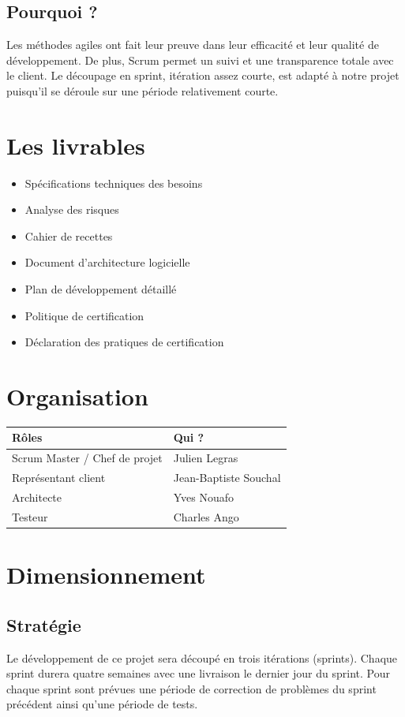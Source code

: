 \documentclass[a4paper,11pt,french]{article}
\begin{document}
\subsection{Pourquoi ?}
Les méthodes agiles ont fait leur preuve dans leur efficacité et leur qualité de développement. De plus, Scrum permet un suivi et une transparence totale avec le client. Le découpage en sprint, itération assez courte, est adapté à notre projet puisqu'il se déroule sur une période relativement courte.

\section{Les livrables}
\begin{itemize}
\item Spécifications techniques des besoins
\item Analyse des risques
\item Cahier de recettes
\item Document d'architecture logicielle
\item Plan de développement détaillé
\item Politique de certification
\item Déclaration des pratiques de certification
\end{itemize}

\section{Organisation}
\begin{tabularx}{16cm}{|l|X|}
\hline
\textbf{Rôles} & \textbf{Qui ?}\\
\hline
Scrum Master / Chef de projet & Julien Legras\\
\hline
Représentant client & Jean-Baptiste Souchal\\

\hline
Architecte & Yves Nouafo\\

\hline
Testeur & Charles Ango\\
\hline
\end{tabularx}

\section{Dimensionnement}
\subsection{Stratégie}
Le développement de ce projet sera découpé en trois itérations (sprints). Chaque sprint durera quatre semaines avec une livraison le dernier jour du sprint. Pour chaque sprint sont prévues une période de correction de problèmes du sprint précédent ainsi qu'une période de tests.
\end{document}
